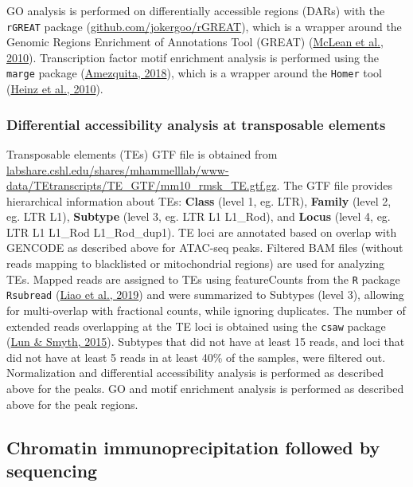 \documentclass[12pt,twoside]{reedthesis}
\begin{document}
GO analysis is performed on differentially accessible regions (DARs)
with the \texttt{rGREAT} package
(\href{https://github.com/jokergoo/rGREAT}{github.com/jokergoo/rGREAT}),
which is a wrapper around the Genomic Regions Enrichment of Annotations
Tool (GREAT) (\protect\hyperlink{ref-mclean2010}{McLean et al., 2010}). Transcription factor motif enrichment
analysis is performed using the \texttt{marge} package (\protect\hyperlink{ref-amezquita2018}{Amezquita, 2018}), which is
a wrapper around the \texttt{Homer} tool (\protect\hyperlink{ref-heinz2010}{Heinz et al., 2010}).

\hypertarget{m3.3.4}{%
\subsubsection*{Differential accessibility analysis at transposable elements}\label{m3.3.4}}

Transposable elements (TEs) GTF file is obtained from
\href{http://labshare.cshl.edu/shares/mhammelllab/www-data/TEtranscripts/TE_GTF/mm10_rmsk_TE.gtf.gz}{labshare.cshl.edu/shares/mhammelllab/www-data/TEtranscripts/TE\_GTF/mm10\_rmsk\_TE.gtf.gz}.
The GTF file provides hierarchical information about TEs: \textbf{Class}
(level 1, eg. LTR), \textbf{Family} (level 2, eg. LTR L1), \textbf{Subtype} (level
3, eg. LTR L1 L1\_Rod), and \textbf{Locus} (level 4, eg. LTR L1 L1\_Rod
L1\_Rod\_dup1). TE loci are annotated based on overlap with GENCODE as
described above for ATAC-seq peaks. Filtered BAM files (without reads
mapping to blacklisted or mitochondrial regions) are used for analyzing
TEs. Mapped reads are assigned to TEs using featureCounts from the \texttt{R}
package \texttt{Rsubread} (\protect\hyperlink{ref-liao2019}{Liao et al., 2019}) and were summarized to Subtypes (level
3), allowing for multi-overlap with fractional counts, while ignoring
duplicates. The number of extended reads overlapping at the TE loci is
obtained using the \texttt{csaw} package (\protect\hyperlink{ref-lun2015}{Lun \& Smyth, 2015}). Subtypes that did not have
at least 15 reads, and loci that did not have at least 5 reads in at
least 40\% of the samples, were filtered out. Normalization and
differential accessibility analysis is performed as described above for
the peaks. GO and motif enrichment analysis is performed as described
above for the peak regions.

\hypertarget{m3.4}{%
\subsection*{Chromatin immunoprecipitation followed by sequencing}\label{m3.4}}
\end{document}
